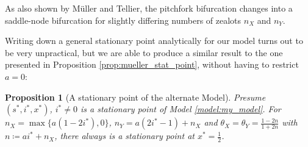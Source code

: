 \documentclass[12pt,a4paper,twoside]{article}
\newtheorem{prop}{Proposition}[section]
\begin{document}
As also shown by M\"uller and Tellier, the pitchfork bifurcation changes into a saddle-node bifurcation for slightly differing numbers of zealots $n_X$ and $n_Y$. 

Writing down a general stationary point analytically for our model turns out to be very unpractical, but we are able to produce a similar result to the one presented in Proposition \ref{prop:mueller_stat_point}, without having to restrict $a = 0$:
\begin{prop}[A stationary point of the alternate Model]\label{prop:theor_stat_point_my_model}\phantom{lel}\newline
	Presume $\left(s^*, i^*, x^*\right)$, $i^* \neq 0$ is a stationary point of Model \ref{model:my_model}. \newline
	For $n_X = \max \lbrace a\left(1-2i^*\right), 0\rbrace$, $n_Y = a\left(2i^* - 1\right) + n_X$ and $\theta_X = \theta_Y = \frac{1-2n}{1+2n}$ with\newline $n \coloneqq ai^* + n_X$, there always is a stationary point at $x^* = \frac{1}{2}$.
\end{prop} 
\end{document}
